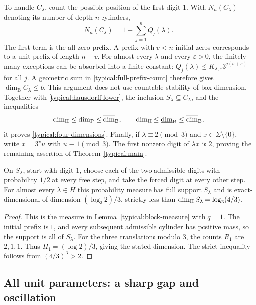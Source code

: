 To handle $C_\lambda$, count the possible position of the first digit
$1$. With $N_n(C_\lambda)$ denoting its number of depth-$n$ cylinders,
\begin{equation}\label{typical:full-prefix-count}
 N_n(C_\lambda)=1+\sum_{j=1}^n Q_j(\lambda).
\end{equation}
The first term is the all-zero prefix. A prefix with $v<n$ initial
zeros corresponds to a unit prefix of length $n-v$. For almost every
$\lambda$ and every $\varepsilon>0$, the finitely many exceptions
can be absorbed into a finite constant:
$Q_j(\lambda)\le K_{\lambda,\varepsilon}3^{j(b+\varepsilon)}$
for all $j$. A geometric sum in \eqref{typical:full-prefix-count}
therefore gives $\overline{\dim}_{\mathrm B}C_\lambda\le b$.
This argument does not use countable stability of box dimension.
Together with \eqref{typical:hausdorff-lower}, the inclusion
$S_\lambda\subseteq C_\lambda$, and the inequalities
\[
 \dim_{\mathrm H}\le\dim_{\mathrm P}\le\overline{\dim}_{\mathrm B},
 \qquad
 \dim_{\mathrm H}\le\underline{\dim}_{\mathrm B}
                \le\overline{\dim}_{\mathrm B},
\]
it proves \eqref{typical:four-dimensions}. Finally, if
$\lambda\equiv2\pmod3$ and $x\in\Sigma\setminus\{0\}$,
write $x=3^v u$ with $u\equiv1\pmod3$. The first nonzero digit
of $\lambda x$ is $2$, proving the remaining assertion of
Theorem~\ref{typical:main}.

\begin{corollary}
\label{typical:canonical-measure}
On $S_\lambda$, start with digit $1$, choose each of the two
admissible digits with probability $1/2$ at every free step, and
take the forced digit at every other step. For almost every
$\lambda\in H$ this probability measure has full support $S_\lambda$
and is exact-dimensional of dimension $(\log_3 2)/3$, strictly
less than $\dim_{\mathrm H} S_\lambda=\log_3(4/3)$.
\end{corollary}

\begin{proof}
This is the measure in Lemma~\ref{typical:block-measure} with $q=1$.
The initial prefix is $1$, and every subsequent admissible cylinder
has positive mass, so the support is all of $S_\lambda$.
For the three translations modulo $3$, the counts $R_1$ are
$2,1,1$. Thus $H_1=(\log2)/3$, giving the stated dimension.
The strict inequality follows from $(4/3)^3>2$.
\end{proof}

\subsection{All unit parameters: a sharp gap and oscillation}

